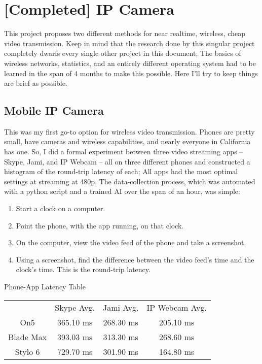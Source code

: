 \section{[Completed] IP Camera}

This project proposes two different methods for near realtime, wireless, cheap video transmission. Keep in mind that the research done by this singular project completely dwarfs every single other project in this document; The basics of wireless networks, statistics, and an entirely different operating system had to be learned in the span of 4 months to make this possible. Here I'll try to keep things are brief as possible.

\subsection{Mobile IP Camera}

This was my first go-to option for wireless video transmission. Phones are pretty small, have cameras and wireless capabilities, and nearly everyone in California has one. So, I did a formal experiment between three video streaming apps -- Skype, Jami, and IP Webcam -- all on three different phones and constructed a histogram of the round-trip latency of each; All apps had the most optimal settings at streaming at 480p. The data-collection process, which was automated with a python script and a trained AI over the span of an hour, was simple:

\begin{enumerate}
\item{Start a clock on a computer.}
\item{Point the phone, with the app running, on that clock.}
\item{On the computer, view the video feed of the phone and take a screenshot.}
\item{Using a screenshot, find the difference between the video feed's time and the clock's time. This is the round-trip latency. }
\end{enumerate}

\begin{centering}
Phone-App Latency Table\\[0.5cm]

\begin{tabular}{c|c|c|c}
    & Skype Avg. & Jami Avg. & IP Webcam Avg. \\[0.5cm]
    On5 & 365.10 ms & 268.30 ms & 205.10 ms \\[0.5cm]
    Blade Max & 393.03 ms & 313.30 ms & 268.60 ms \\[0.5cm]
    Stylo 6 & 729.70 ms & 301.90 ms & 164.80 ms
\end{tabular} \newline

\end{centering}


